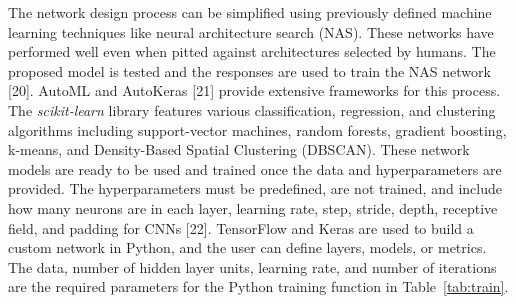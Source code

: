 \documentclass[preprint,12pt]{elsarticle}
\begin{document}
The network design process can be simplified using previously defined machine learning techniques like neural architecture search (NAS). These networks have performed well even when pitted against architectures selected by humans. The proposed model is tested and the responses are used to train the NAS network [20]. AutoML and AutoKeras [21] provide extensive frameworks for this process. The \textit{scikit-learn} library features various classification, regression, and clustering algorithms including support-vector machines, random forests, gradient boosting, k-means, and Density-Based Spatial Clustering (DBSCAN). These network models are ready to be used and trained once the data and hyperparameters are provided. The hyperparameters must be predefined, are not trained, and include how many neurons are in each layer, learning rate, step, stride, depth, receptive field, and padding for CNNs [22]. TensorFlow and Keras are used to build a custom network in Python, and the user can define layers, models, or metrics. The data, number of hidden layer units, learning rate, and number of iterations are the required parameters for the Python training function in Table~\ref{tab:train}.
\end{document}
